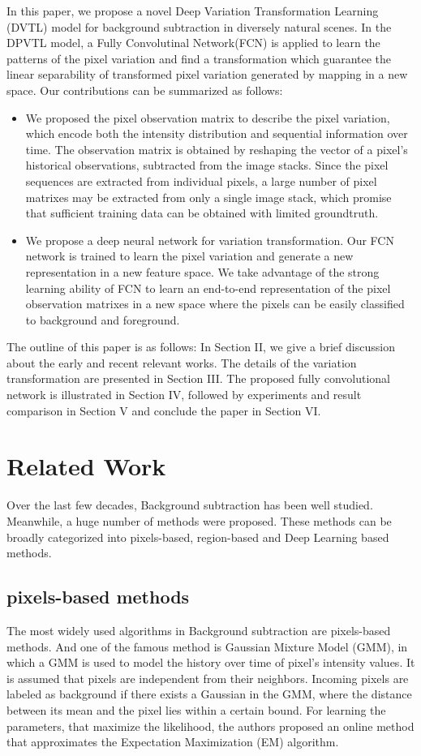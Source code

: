 \documentclass[journal]{IEEEtran}
\begin{document}
In this paper, we propose a novel Deep Variation Transformation Learning (DVTL) model for background subtraction in diversely natural scenes. In the DPVTL model, a Fully Convolutinal Network(FCN) is applied to learn the patterns of the pixel variation and find a transformation which guarantee the linear separability of transformed pixel variation generated by mapping in a new space. Our contributions can be summarized as follows:
\begin{itemize}
\item We proposed the pixel observation matrix to describe the pixel variation, which encode both the intensity distribution and sequential information over time. The observation matrix is obtained by reshaping the vector of a pixel's historical observations, subtracted from the image stacks. Since the pixel sequences are extracted from individual pixels, a large number of pixel matrixes may be extracted from only a single image stack, which promise that sufficient training data can be obtained with limited groundtruth.
\item We propose a deep neural network for variation transformation. Our FCN network is trained to learn the pixel variation and generate a new representation in a new feature space. We take advantage of the strong learning ability of FCN to learn an end-to-end representation of the pixel observation matrixes in a new space where the pixels can be easily classified to background and foreground.
\end{itemize}

The outline of this paper is as follows: In Section II, we give a brief discussion about the early and recent relevant works. The details of the variation transformation are presented in Section III. The proposed fully convolutional network is illustrated in Section IV, followed by experiments and result comparison in Section V and conclude the paper in Section VI. 
\section{Related Work}
\cite{Bouwmans2014}
Over the last few decades, Background subtraction has been well studied. Meanwhile, a huge number of methods were proposed. 
These methods can be broadly categorized into pixels-based, region-based and Deep Learning based methods.
\subsection{pixels-based methods}
The most widely used algorithms in Background subtraction are pixels-based methods. 
And one of the famous method is Gaussian Mixture Model (GMM), in which a GMM is used to model the history over time of pixel’s intensity values. 
It is assumed that pixels are independent from their neighbors. 
Incoming pixels are labeled as background if there exists a Gaussian in the GMM, where the distance between its mean and the pixel lies within a certain bound. 
For learning the parameters, that maximize the likelihood, the authors proposed an online method that approximates the Expectation Maximization (EM) algorithm. 
\end{document}
